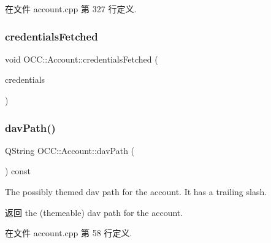 在文件 account.\+cpp 第 327 行定义.

\mbox{\label{class_o_c_c_1_1_account_a23d58f3d44c684a6ed7c0e4ecc0039ab}} 
\subsubsection{\texorpdfstring{credentials\+Fetched}{credentialsFetched}}
{\footnotesize\ttfamily void O\+C\+C\+::\+Account\+::credentials\+Fetched (\begin{DoxyParamCaption}\item[{\hyperlink{class_o_c_c_1_1_abstract_credentials}{Abstract\+Credentials} $\ast$}]{credentials }\end{DoxyParamCaption})\hspace{0.3cm}{\ttfamily [signal]}}

\mbox{\label{class_o_c_c_1_1_account_a75a7f141d4bb9bf9034318c440e419c8}} 
\subsubsection{\texorpdfstring{dav\+Path()}{davPath()}}
{\footnotesize\ttfamily Q\+String O\+C\+C\+::\+Account\+::dav\+Path (\begin{DoxyParamCaption}{ }\end{DoxyParamCaption}) const}



The possibly themed dav path for the account. It has a trailing slash. 

\begin{DoxyReturn}{返回}
the (themeable) dav path for the account. 
\end{DoxyReturn}


在文件 account.\+cpp 第 58 行定义.

\mbox{\label{class_o_c_c_1_1_account_ab4e665df93173f822399b7987d394596}} 
